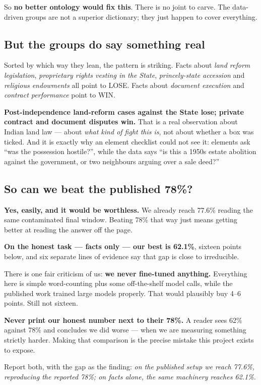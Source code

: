 \documentclass[12pt,a4paper]{article}
\begin{document}
So \textbf{no better ontology would fix this}. There is no joint to carve. The data-driven groups are
not a superior dictionary; they just happen to cover everything.

\subsection{But the groups do say something real}

Sorted by which way they lean, the pattern is striking. Facts about \emph{land reform legislation},
\emph{proprietary rights vesting in the State}, \emph{princely-state accession} and \emph{religious
endowments} all point to LOSE. Facts about \emph{document execution} and \emph{contract performance}
point to WIN.

\textbf{Post-independence land-reform cases against the State lose; private contract and document
disputes win.} That is a real observation about Indian land law --- about \emph{what kind of fight
this is}, not about whether a box was ticked. And it is exactly why an element checklist could not
see it: elements ask ``was the possession hostile?'', while the data says ``is this a 1950s estate
abolition against the government, or two neighbours arguing over a sale deed?''

\subsection{So can we beat the published 78\%?}

\textbf{Yes, easily, and it would be worthless.} We already reach 77.6\% reading the same contaminated
final window. Beating 78\% that way just means getting better at reading the answer off the page.

\textbf{On the honest task --- facts only --- our best is 62.1\%}, sixteen points below, and six
separate lines of evidence say that gap is close to irreducible.

There is one fair criticism of us: \textbf{we never fine-tuned anything.} Everything here is simple
word-counting plus some off-the-shelf model calls, while the published work trained large models
properly. That would plausibly buy 4--6 points. Still not sixteen.

\begin{tcolorbox}[plainbox,title={The comparison to refuse}]
\textbf{Never print our honest number next to their 78\%.} A reader sees 62\% against 78\% and
concludes we did worse --- when we are measuring something strictly harder. Making that comparison is
the precise mistake this project exists to expose.

\smallskip
Report both, with the gap as the finding: \emph{on the published setup we reach 77.6\%, reproducing
the reported 78\%; on facts alone, the same machinery reaches 62.1\%.}
\end{tcolorbox}
\end{document}

